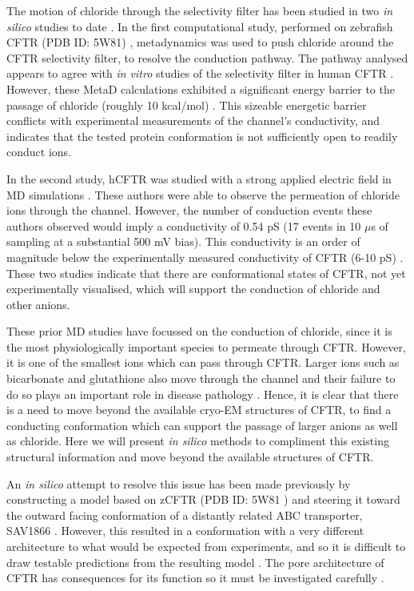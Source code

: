The motion of chloride through the selectivity filter has been studied in two \textit{in silico} studies to date \cite{farkas2020, zeng2021}. In the first computational study, performed on zebrafish CFTR (PDB ID: 5W81) \cite{zhang2017a}, metadynamics was used to push chloride around the CFTR selectivity filter, to resolve the conduction pathway. The pathway analysed appears to agree with \textit{in vitro} studies of the selectivity filter in human CFTR \cite{linsdell2016}. However, these MetaD calculations exhibited a significant energy barrier to the passage of chloride (roughly 10 kcal/mol) \cite{farkas2020}. This sizeable energetic barrier conflicts with experimental measurements of the channel's conductivity, and indicates that the tested protein conformation is not sufficiently open to readily conduct ions. 

In the second study, hCFTR was studied with a strong applied electric field in MD simulations \cite{zeng2021}. These authors were able to observe the permeation of chloride ions through the channel. However, the number of conduction events these authors observed would imply a conductivity of 0.54 pS (17 events in 10 $\mu$s of sampling at a substantial 500 mV bias). This conductivity is an order of magnitude below the experimentally measured conductivity of CFTR (6-10 pS) \cite{gong2004, lee2007, linsdell2001, sheppard1999}. These two studies indicate that there are conformational states of CFTR, not yet experimentally visualised, which will support the conduction of chloride and other anions. 

These prior MD studies have focussed on the conduction of chloride, since it is the most physiologically important species to permeate through CFTR. However, it is one of the smallest ions which can pass through CFTR. Larger ions such as bicarbonate and glutathione also move through the channel and their failure to do so plays an important role in disease pathology \cite{gao1999, kogan2003, linsdell1998, tang2009, larusch2014, jun2016}. Hence, it is clear that there is a need to move beyond the available cryo-EM structures of CFTR, to find a conducting conformation which can support the passage of larger anions as well as chloride. Here we will present \textit{in silico} methods to compliment this existing structural information and move beyond the available structures of CFTR. 

An \textit{in silico} attempt to resolve this issue has been made previously by constructing a model based on zCFTR (PDB ID: 5W81 \cite{zhang2017a}) and steering it toward the outward facing conformation of a distantly related ABC transporter, SAV1866 \cite{hoffmann2018, dawson2006}. However, this resulted in a conformation with a very different architecture to what would be expected from experiments, and so it is difficult to draw testable predictions from the resulting model \cite{hoffmann2018, linsdell2018}. The pore architecture of CFTR has consequences for its function so it must be investigated carefully \cite{linsdell2016, linsdell2018, cui2008}. 

